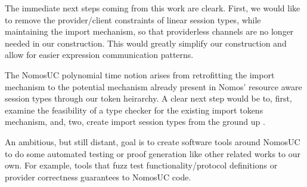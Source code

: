 The immediate next steps coming from this work are cleark.
First, we would like to remove the provider/client constraints of linear session types, while maintaining the import mechanism, so that providerless channels are no longer needed in our construction.
This would greatly simplify our construction and allow for easier expression communication patterns. 

The NomosUC polynomial time notion arises from retrofitting the import mechanism to the potential mechanism already present in Nomos' resource aware session types through our token heirarchy.
A clear next step would be to, first, examine the feasibility of a type checker for the existing import tokens mechanism, and, two, create import session types from the ground up .

An ambitious, but still distant, goal is to create software tools around NomosUC to do some automated testing or proof generation like other related works to our own. For example, tools that fuzz test functionality/protocol definitions or provider correctness guarantees to NomosUC code. 

